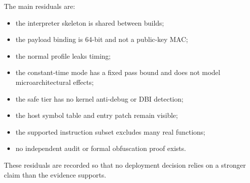 The main residuals are:

\begin{itemize}
  \item the interpreter skeleton is shared between builds;
  \item the payload binding is 64-bit and not a public-key MAC;
  \item the normal profile leaks timing;
  \item the constant-time mode has a fixed pass bound and does not model
        microarchitectural effects;
  \item the safe tier has no kernel anti-debug or DBI detection;
  \item the host symbol table and entry patch remain visible;
  \item the supported instruction subset excludes many real functions;
  \item no independent audit or formal obfuscation proof exists.
\end{itemize}

These residuals are recorded so that no deployment decision relies on a stronger
claim than the evidence supports.
